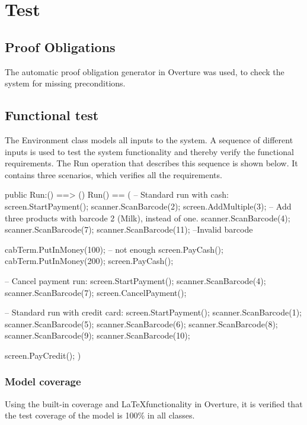 \chapter{Test}\label{chp:Test}

\section{Proof Obligations}
The automatic proof obligation generator in Overture was used, to check the system for missing preconditions.

\section{Functional test}
The Environment class models all inputs to the system. A sequence of different inputs is used to test the system functionality and thereby verify the functional requirements. The Run operation that describes this sequence is shown below. It contains three scenarios, which verifies all the requirements.
\begin{vdmpp}
 public Run:() ==> ()
 Run() ==
 (
 -- Standard run with cash:
  screen.StartPayment();
  scanner.ScanBarcode(2);
  screen.AddMultiple(3); -- Add three products with barcode 2 (Milk), instead of one.
  scanner.ScanBarcode(4);
  scanner.ScanBarcode(7);
  scanner.ScanBarcode(11); --Invalid barcode
  
  cabTerm.PutInMoney(100); -- not enough
  screen.PayCash();
  cabTerm.PutInMoney(200);
  screen.PayCash();
 
 -- Cancel payment run: 
  screen.StartPayment();
  scanner.ScanBarcode(4);
  scanner.ScanBarcode(7);
  screen.CancelPayment(); 
 
 -- Standard run with credit card:
  screen.StartPayment();
  scanner.ScanBarcode(1);
  scanner.ScanBarcode(5);
  scanner.ScanBarcode(6);
  scanner.ScanBarcode(8);
  scanner.ScanBarcode(9);
  scanner.ScanBarcode(10);
  
  screen.PayCredit();
 )
\end{vdmpp}

\subsection{Model coverage}
Using the built-in coverage and \LaTeX \hspace{2pt}functionality in Overture, it is verified that the test coverage of the model is 100\% in all classes.


